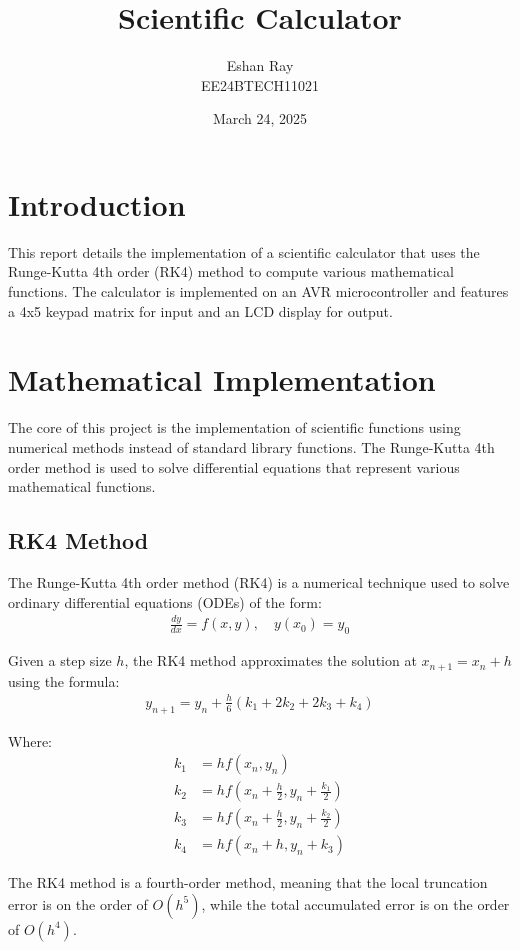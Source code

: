\documentclass{article}
\title{Scientific Calculator}
\author{Eshan Ray\\EE24BTECH11021}
\date{March 24, 2025}
\begin{document}
\maketitle

\section{Introduction}
This report details the implementation of a scientific calculator that uses the Runge-Kutta 4th order (RK4) method to compute various mathematical functions. The calculator is implemented on an AVR microcontroller and features a 4x5 keypad matrix for input and an LCD display for output.

\section{Mathematical Implementation}
The core of this project is the implementation of scientific functions using numerical methods instead of standard library functions. The Runge-Kutta 4th order method is used to solve differential equations that represent various mathematical functions.

\subsection{RK4 Method}
The Runge-Kutta 4th order method (RK4) is a numerical technique used to solve ordinary differential equations (ODEs) of the form:
\begin{align}
\frac{dy}{dx} = f(x, y), \quad y(x_0) = y_0
\end{align}

Given a step size $h$, the RK4 method approximates the solution at $x_{n+1} = x_n + h$ using the formula:
\begin{align}
y_{n+1} = y_n + \frac{h}{6}(k_1 + 2k_2 + 2k_3 + k_4)
\end{align}

Where:
\begin{align}
k_1 &= hf(x_n, y_n)\\
k_2 &= hf\left(x_n + \frac{h}{2}, y_n + \frac{k_1}{2}\right)\\
k_3 &= hf\left(x_n + \frac{h}{2}, y_n + \frac{k_2}{2}\right)\\
k_4 &= hf(x_n + h, y_n + k_3)
\end{align}

The RK4 method is a fourth-order method, meaning that the local truncation error is on the order of $O(h^5)$, while the total accumulated error is on the order of $O(h^4)$.
\end{document}
